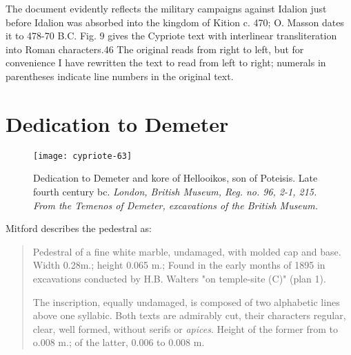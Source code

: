 The document evidently reflects the military
campaigns against Idalion just before Idalion was absorbed into the
kingdom of Kition c. 470; O. Masson dates it to 478-70 B.C. Fig. 9 gives
the Cypriote text with interlinear transliteration into Roman characters.46
The original reads from right to left, but for convenience I have rewritten
the text to read from left to right; numerals in parentheses indicate line
numbers in the original text.

\section{Dedication to Demeter}

\begin{figure}[htbp]
\texttt{[image: cypriote-63]}
\caption{Dedication to Demeter and kore of Hellooikos, son of Poteisis. Late fourth century bc. \textit{London, British Museum, Reg. no. 96, 2-1, 215. From the Temenos of Demeter, excavations of the British Museum.}}
\end{figure}

Mitford describes the pedestral as:

\begin{quotation}
Pedestral of a fine white marble, undamaged, with molded cap and base. Width 0.28m.; height 0.065 m.; Found in the early months of 1895 in excavations conducted by H.B. Walters "on temple-site (C)" (plan 1).

\indent The inscription, equally undamaged, is composed of two alphabetic lines above one syllabic. Both texts are admirably cut, their characters regular, clear, well formed, without serifs or \textit{apices}. Height of the former from to o.008 m.; of the latter, 0.006 to 0.008 m.
\end{quotation}



